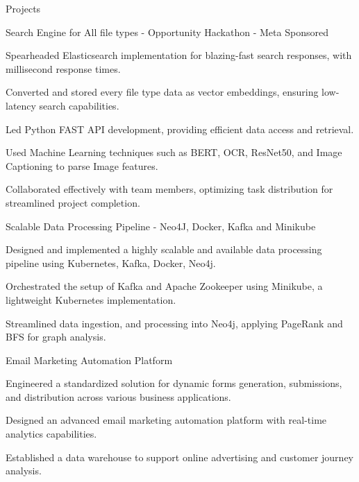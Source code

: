 \documentclass{resume} %
\begin{document}
    \begin{rSection}{Projects}
                    \begin{rSubsection}
                                    {Search Engine for All file types {-} Opportunity Hackathon {-} Meta Sponsored}
                                {}{}{}
                                    \item Spearheaded Elasticsearch implementation for blazing{-}fast search responses, with millisecond response times.
                                    \item Converted and stored every file type data as vector embeddings, ensuring low{-}latency search capabilities.
                                    \item Led Python FAST API development, providing efficient data access and retrieval.
                                    \item Used Machine Learning techniques such as BERT, OCR, ResNet50, and Image Captioning to parse Image features.
                                    \item Collaborated effectively with team members, optimizing task distribution for streamlined project completion.
                            \end{rSubsection}
                    \begin{rSubsection}
                                    {Scalable Data Processing Pipeline {-} Neo4J, Docker, Kafka and Minikube}
                                {}{}{}
                                    \item Designed and implemented a highly scalable and available data processing pipeline using Kubernetes, Kafka, Docker, Neo4j.
                                    \item Orchestrated the setup of Kafka and Apache Zookeeper using Minikube, a lightweight Kubernetes implementation.
                                    \item Streamlined data ingestion, and processing into Neo4j, applying PageRank and BFS for graph analysis.
                            \end{rSubsection}
                    \begin{rSubsection}
                                    {Email Marketing Automation Platform}
                                {}{}{}
                                    \item Engineered a standardized solution for dynamic forms generation, submissions, and distribution across various business applications.
                                    \item Designed an advanced email marketing automation platform with real{-}time analytics capabilities.
                                    \item Established a data warehouse to support online advertising and customer journey analysis.
                            \end{rSubsection}
            \end{rSection}
\end{document}
